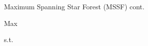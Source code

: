 \begin{frame}{Maximum Spanning Star Forest (MSSF) cont.}
\begin{center}
\Huge
Max 

s.t.

\end{center}
\end{frame}